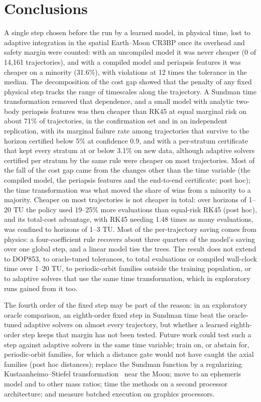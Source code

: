 \documentclass[10pt,letterpaper]{article}
\begin{document}
\section*{Conclusions}
A single step chosen before the run by a learned model, in physical time, lost to adaptive integration in the spatial Earth--Moon CR3BP once its overhead and safety margin were counted: with an uncompiled model it was never cheaper (0 of 14,161 trajectories), and with a compiled model and periapsis features it was cheaper on a minority (31.6\%), with violations at 12 times the tolerance in the median. The decomposition of the cost gap showed that the penalty of any fixed physical step tracks the range of timescales along the trajectory. A Sundman time transformation removed that dependence, and a small model with analytic two-body periapsis features was then cheaper than RK45 at equal marginal risk on about 71\% of trajectories, in the confirmation set and in an independent replication, with its marginal failure rate among trajectories that survive to the horizon certified below 5\% at confidence 0.9, and with a per-stratum certificate that kept every stratum at or below 3.1\% on new data, although adaptive solvers certified per stratum by the same rule were cheaper on most trajectories. Most of the fall of the cost gap came from the changes other than the time variable (the compiled model, the periapsis features and the end-to-end certificate; post hoc); the time transformation was what moved the share of wins from a minority to a majority. Cheaper on most trajectories is not cheaper in total: over horizons of 1--20 TU the policy used 19--25\% more evaluations than equal-risk RK45 (post hoc), and its total-cost advantage, with RK45 needing 1.48 times as many evaluations, was confined to horizons of 1--3 TU. Most of the per-trajectory saving comes from physics: a four-coefficient rule recovers about three quarters of the model's saving over one global step, and a linear model ties the trees. The result does not extend to DOP853, to oracle-tuned tolerances, to total evaluations or compiled wall-clock time over 1--20 TU, to periodic-orbit families outside the training population, or to adaptive solvers that use the same time transformation, which in exploratory runs gained from it too.

The fourth order of the fixed step may be part of the reason: in an exploratory oracle comparison, an eighth-order fixed step in Sundman time beat the oracle-tuned adaptive solvers on almost every trajectory, but whether a learned eighth-order step keeps that margin has not been tested. Future work could test such a step against adaptive solvers in the same time variable; train on, or abstain for, periodic-orbit families, for which a distance gate would not have caught the axial families (post hoc distances); replace the Sundman function by a regularizing Kustaanheimo--Stiefel transformation~\cite{kustaanheimo1965} near the Moon; move to an ephemeris model and to other mass ratios; time the methods on a second processor architecture; and measure batched execution on graphics processors.
\end{document}
